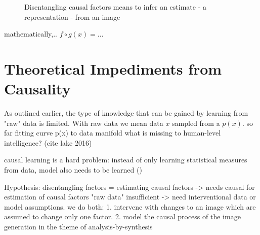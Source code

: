 		\begin{figure}[ht]
			\centering
			
			\caption{Disentangling causal factors means to infer an estimate - \ie a representation - from an image}
			\label{fig:infer}
		\end{figure}
		mathematically,..
		$f \circ g (x) = ... $


\section{Theoretical Impediments from Causality}\label{sec:causality}
	As outlined earlier, the type of knowledge that can be gained by learning from "raw" data is limited. With raw data we mean data $x$ sampled from a $p(x)$.
	so far fitting curve p(x) to data manifold
	what is missing to human-level intelligence? (cite lake 2016)

	causal learning is a hard problem: instead of only learning statistical measures from data, model also needs to be learned (\cite{peters17elements})


	Hypothesis: disentangling factors = estimating causal factors -> needs causal
	for estimation of causal factors "raw data" insufficient -> need interventional data or model assumptions.
	we do both:
	1. intervene with changes to an image which are assumed to change only one factor.
	2. model the causal process of the image generation in the theme of analysis-by-synthesis

